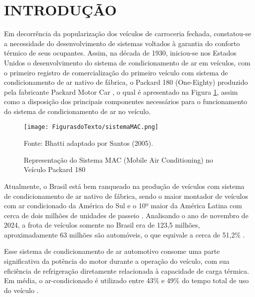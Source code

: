 \section{INTRODUÇÃO}

Em decorrência da popularização dos veículos de carroceria fechada, constatou-se a necessidade do desenvolvimento de sistemas voltados à garantia do conforto térmico de seus ocupantes. 
Assim, na década de 1930, iniciou-se nos Estados Unidos o desenvolvimento do sistema de condicionamento de ar em veículos, com o primeiro registro de comercialização do primeiro veículo com sistema de condicionamento de ar nativo de fábrica, o Packard 180 (One-Eighty) produzido pela fabricante Packard Motor Car \cite{bhatti1999}, o qual é apresentado na Figura \ref{fig:sistemaMAC}, assim como a disposição dos principais componentes necessários para o funcionamento do sistema de condicionamento de ar no veículo.
\\

\begin{figure}[h]
    \centering
    
    \caption{ Representação do Sistema MAC (Mobile Air Conditioning) no Veículo Packard 180}
    
    \texttt{[image: FigurasdoTexto/sistemaMAC.png]}
    
     \vspace{5pt}  %
    {\footnotesize Fonte: Bhatti adaptado por Santos (2005).}  %
    \label{fig:sistemaMAC}
\end{figure}

Atualmente, o Brasil está bem ranqueado na produção de veículos com sistema de condicionamento de ar nativo de fábrica, sendo o maior montador de veículos com ar condicionado da América do Sul e o 10º maior da América Latina com cerca de dois milhões de unidades de passeio \cite{dasilva2024}. Analisando o ano de novembro de 2024, a frota de veículos somente no Brasil era de 123,5 milhões, aproximadamente 63 milhões são automóveis, o que equivale a cerca de 51,2\%  \cite{ministerio2024}.

Esse sistema de condicionamento de ar automotivo consome uma parte significativa da potência do motor durante a operação do veículo, com sua eficiência de refrigeração diretamente relacionada à capacidade de carga térmica. Em média, o ar-condicionado é utilizado entre 43\% e 49\% do tempo total de uso do veículo \cite{farrington2000}.

